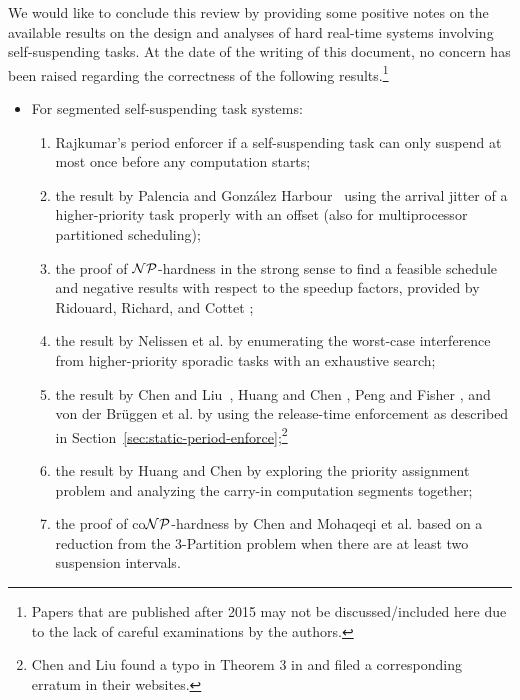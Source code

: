 We would like to conclude this review by providing some positive notes on the available results on the design and analyses of hard real-time systems
involving self-suspending tasks.  At the date of the writing of this
document, no concern has been raised regarding the correctness of the
following results.\footnote{Papers that are published after 2015 may
  not be discussed/included here due to the lack of careful examinations by the authors.} %
\begin{itemize}
\item For segmented self-suspending task systems: 
  \begin{enumerate}
  \item Rajkumar's period enforcer \cite{Raj:suspension1991}
    if a self-suspending task
    can only suspend at most once before any computation starts;
  \item the result by Palencia and Gonz\'alez
    Harbour~\cite{PH:rtss98} using the arrival jitter of a
    higher-priority task properly with an offset (also for
    multiprocessor partitioned scheduling);
  \item the proof of ${\cal NP}$-hardness in the strong sense to find a feasible
    schedule and negative results with respect to the speedup factors,
    provided by Ridouard, Richard, and Cottet \cite{Ridouard_2004};
  \item the result by Nelissen et al. \cite{ecrts15nelissen} by
    enumerating the worst-case interference from higher-priority
    sporadic tasks with an exhaustive search;
  \item the result by Chen and Liu~\cite{RTSS-ChenL14}, Huang and
    Chen \cite{WC16-suspend-DATE}, Peng and Fisher
    \cite{Peng-Fisher-RTCSA2016}, and von der Br\"uggen et al. \cite{Bruggen16RTNS} by using the release-time
    enforcement as described in
    Section~\ref{sec:static-period-enforce};\footnote{Chen and Liu
      found a typo in Theorem 3 in \cite{RTSS-ChenL14}
      and filed a corresponding erratum in their websites.}
  \item the result by Huang and Chen \cite{Huang:multiseg} by
    exploring the priority assignment problem and analyzing the
    carry-in computation segments together;
 \item the proof of co${\cal NP}$-hardness by Chen
   \cite{RTSS2016-suspension} and Mohaqeqi et al. \cite{DBLP:conf/rtns/MohaqeqiE016} based on
   a reduction from the 3-Partition problem when there are at least two suspension intervals.
  \end{enumerate}

\end{itemize}
